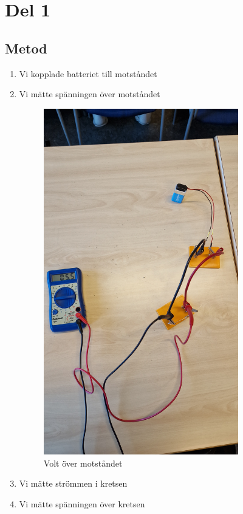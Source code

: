 \documentclass[11p]{article}
\begin{document}
    \section{Del 1}
    \subsection{Metod}
        \begin{enumerate}
            \item Vi kopplade batteriet till motståndet
            \item Vi mätte spänningen över motståndet
            \begin{figure}[!h]
                \includegraphics[width=0.8\textwidth]{images/enkelVolt}
                \caption{Volt över motståndet}
                \label{fig:eV}
            \end{figure}
            \item Vi mätte strömmen i kretsen
            \item Vi mätte spänningen över kretsen
        \end{enumerate}
    \newpage
\end{document}
